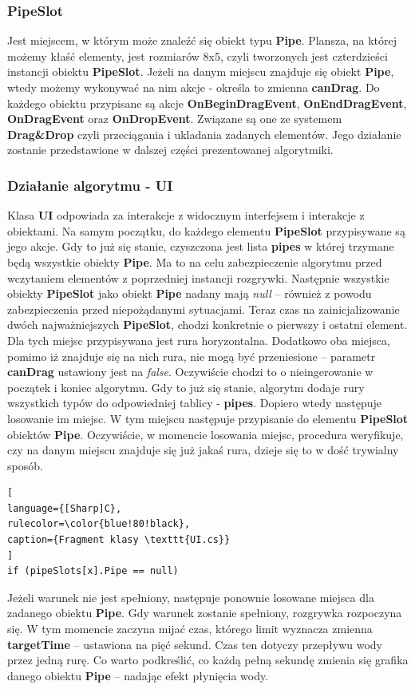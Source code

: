 \documentclass[oneside,polski,logo]{amuthesis}
\begin{document}
\subsubsection{PipeSlot}
\par Jest miejscem, w którym może znaleźć się obiekt typu \textbf{Pipe}. Plansza, na której możemy kłaść elementy, jest rozmiarów 8x5, czyli tworzonych jest czterdzieści instancji obiektu \textbf{PipeSlot}. Jeżeli na danym miejscu znajduje się obiekt \textbf{Pipe}, wtedy możemy wykonywać na nim akcje - określa to zmienna \textbf{canDrag}. Do każdego obiektu przypisane są akcje \textbf{OnBeginDragEvent}, \textbf{OnEndDragEvent}, \textbf{OnDragEvent} oraz \textbf{OnDropEvent}. Związane są one ze systemem \textbf{Drag\&Drop} czyli przeciągania i ukladania zadanych elementów. Jego działanie zostanie przedstawione w dalszej części prezentowanej algorytmiki.
\subsubsection{Działanie algorytmu - UI}
\par Klasa \textbf{UI} odpowiada za interakcje z widocznym interfejsem i interakcje z obiektami. Na samym początku, do każdego elementu \textbf{PipeSlot} przypisywane są jego akcje. Gdy to już się stanie, czyszczona jest lista \textbf{pipes} w której trzymane będą wszystkie obiekty \textbf{Pipe}. Ma to na celu zabezpieczenie algorytmu przed wczytaniem elementów z poprzedniej instancji rozgrywki. Następnie wszystkie obiekty \textbf{PipeSlot} jako obiekt \textbf{Pipe} nadany mają \emph{null} – również z powodu zabezpieczenia przed niepożądanymi sytuacjami. Teraz czas na zainicjalizowanie dwóch najważniejszych \textbf{PipeSlot}, chodzi konkretnie o pierwszy i ostatni element. Dla tych miejsc przypisywana jest rura horyzontalna. Dodatkowo oba miejsca, pomimo iż znajduje się na nich rura, nie mogą być przeniesione – parametr \textbf{canDrag} ustawiony jest na \emph{false}. Oczywiście chodzi to o nieingerowanie w początek i koniec algorytmu. Gdy to już się stanie, algorytm dodaje rury wszystkich typów do odpowiedniej tablicy - \textbf{pipes}. Dopiero wtedy następuje losowanie im miejsc. W tym miejscu następuje przypisanie do elementu \textbf{PipeSlot} obiektów \textbf{Pipe}. Oczywiście, w momencie losowania miejsc, procedura weryfikuje, czy na danym miejscu znajduje się już jakaś rura, dzieje się to w dość trywialny sposób.

\begin{lstlisting}[
language={[Sharp]C},
rulecolor=\color{blue!80!black},
caption={Fragment klasy \texttt{UI.cs}}
]
if (pipeSlots[x].Pipe == null)
\end{lstlisting}
Jeżeli warunek nie jest spełniony, następuje ponownie losowane miejsca dla zadanego obiektu \textbf{Pipe}. Gdy warunek zostanie spełniony, rozgrywka rozpoczyna się. W tym momencie zaczyna mijać czas, którego limit wyznacza zmienna \textbf{targetTime} – ustawiona na pięć sekund. Czas ten dotyczy przepływu wody przez jedną rurę. Co warto podkreślić, co każdą pełną sekundę zmienia się grafika danego obiektu \textbf{Pipe} – nadając efekt płynięcia wody.
\end{document}
